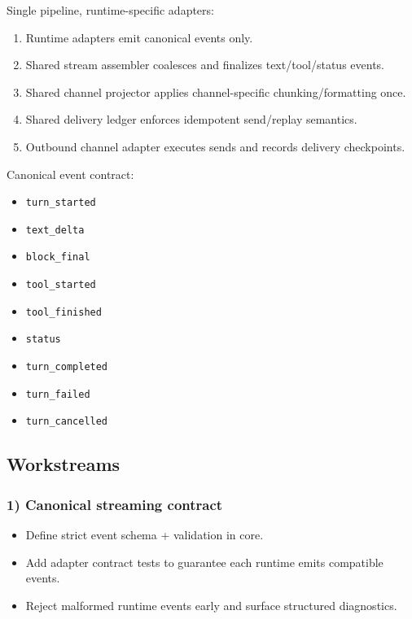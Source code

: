 Single pipeline, runtime-specific adapters:

\begin{enumerate}
  \item Runtime adapters emit canonical events only.
  \item Shared stream assembler coalesces and finalizes text/tool/status events.
  \item Shared channel projector applies channel-specific chunking/formatting once.
  \item Shared delivery ledger enforces idempotent send/replay semantics.
  \item Outbound channel adapter executes sends and records delivery checkpoints.
\end{enumerate}


Canonical event contract:

\begin{itemize}
  \item \texttt{turn\_started}
  \item \texttt{text\_delta}
  \item \texttt{block\_final}
  \item \texttt{tool\_started}
  \item \texttt{tool\_finished}
  \item \texttt{status}
  \item \texttt{turn\_completed}
  \item \texttt{turn\_failed}
  \item \texttt{turn\_cancelled}
\end{itemize}


\subsection{Workstreams}


\subsubsection{1) Canonical streaming contract}


\begin{itemize}
  \item Define strict event schema + validation in core.
  \item Add adapter contract tests to guarantee each runtime emits compatible events.
  \item Reject malformed runtime events early and surface structured diagnostics.
\end{itemize}


